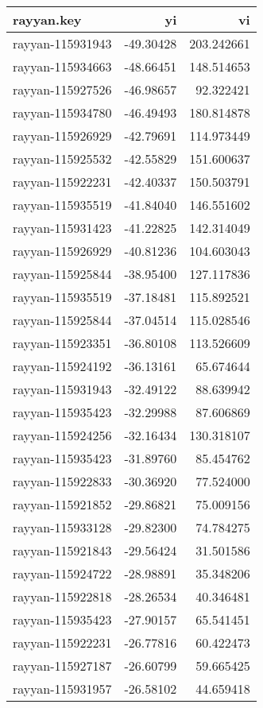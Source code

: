 \documentclass[
]{article}
\begin{document}
\begin{longtable}[]{@{}lrr@{}}
\toprule()
rayyan.key & yi & vi \\
\midrule()
\endhead
rayyan-115931943 & -49.30428 & 203.242661 \\
rayyan-115934663 & -48.66451 & 148.514653 \\
rayyan-115927526 & -46.98657 & 92.322421 \\
rayyan-115934780 & -46.49493 & 180.814878 \\
rayyan-115926929 & -42.79691 & 114.973449 \\
rayyan-115925532 & -42.55829 & 151.600637 \\
rayyan-115922231 & -42.40337 & 150.503791 \\
rayyan-115935519 & -41.84040 & 146.551602 \\
rayyan-115931423 & -41.22825 & 142.314049 \\
rayyan-115926929 & -40.81236 & 104.603043 \\
rayyan-115925844 & -38.95400 & 127.117836 \\
rayyan-115935519 & -37.18481 & 115.892521 \\
rayyan-115925844 & -37.04514 & 115.028546 \\
rayyan-115923351 & -36.80108 & 113.526609 \\
rayyan-115924192 & -36.13161 & 65.674644 \\
rayyan-115931943 & -32.49122 & 88.639942 \\
rayyan-115935423 & -32.29988 & 87.606869 \\
rayyan-115924256 & -32.16434 & 130.318107 \\
rayyan-115935423 & -31.89760 & 85.454762 \\
rayyan-115922833 & -30.36920 & 77.524000 \\
rayyan-115921852 & -29.86821 & 75.009156 \\
rayyan-115933128 & -29.82300 & 74.784275 \\
rayyan-115921843 & -29.56424 & 31.501586 \\
rayyan-115924722 & -28.98891 & 35.348206 \\
rayyan-115922818 & -28.26534 & 40.346481 \\
rayyan-115935423 & -27.90157 & 65.541451 \\
rayyan-115922231 & -26.77816 & 60.422473 \\
rayyan-115927187 & -26.60799 & 59.665425 \\
rayyan-115931957 & -26.58102 & 44.659418 \\

\end{longtable}
\end{document}
